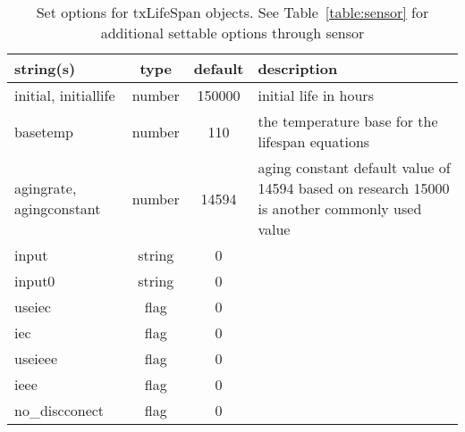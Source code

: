 \begin{table}[ht]
\centering
\begin{tabular}{p{5cm} c c p{7cm}}
\hline
string(s) & type & default & description \\
\hline
initial, initiallife & number & 150000 & initial life in hours\\
basetemp & number & 110 & the temperature base for the lifespan equations\\
agingrate, agingconstant & number & 14594 & aging constant default value of 14594 based on research 15000 is another commonly used value\\
input & string & 0 & \\
input0 & string & 0 & \\
useiec & flag & 0 & \\
iec & flag & 0 & \\
useieee & flag & 0 & \\
ieee & flag & 0 & \\
no\_discconect & flag & 0 & \\
\hline
\end{tabular}
\caption{Set options for txLifeSpan objects. See Table~\ref{table:sensor} for additional settable options through sensor}
\label{table:txLifeSpan}
\end{table}

